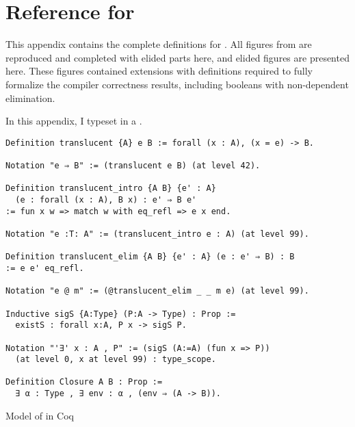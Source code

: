 \renewcommand{\techprefix}{refpcc}
\renewcommand{\tlang}{\pcctlang}
\renewcommand{\slang}{\pccslang}

\chapter{Reference for \pcctlang}
\label{sec:param-cc:appendix}
This appendix contains the complete definitions for \pcctlang.
All \pcctlang figures from  are reproduced and completed
with elided parts here, and elided figures are presented here.
These figures contained extensions with definitions required to fully formalize
the compiler correctness results, including booleans with non-dependent
elimination.

\begin{typographical}
  In this appendix, I typeset \pcctlang in a \emph{}.
\end{typographical}

\FigCoCCCSyntaxFull[ht]
\FigCoCCCSugar[ht]
\FigCoCCCRedFull[ht]
\FigCoCCCConv[ht]
\FigCoCCCEquivFull[ht]
\FigCoCCCTypingOne[ht]
\FigCoCCCTypingTwo[ht]

\begingroup
\let\label\discard
\renewcommand{\cpstlang}{\pcctlang}
\renewcommand{\slang}{\pcctlang}
\renewcommand{\sfont}{\pccfont}
\renewcommand{\sfontsym}{\pccfontsym}
\renewcommand{\scolor}{\pcccolor}

\FigCPSWf[ht]
\FigECCObs[ht]
\FigECCProg[ht]
\FigECCEval[ht]

\endgroup

\begingroup
\let\label\discard
\renewcommand{\cpsslang}{\pcctlang}
\renewcommand{\sfont}{\pccfont}
\renewcommand{\sfontsym}{\pccfontsym}
\renewcommand{\scolor}{\pcccolor}

\FigCOCLinking
\endgroup

\FloatBarrier

\begin{listing}[h]
\begin{verbatim}
Definition translucent {A} e B := forall (x : A), (x = e) -> B.

Notation "e ⇒ B" := (translucent e B) (at level 42).

Definition translucent_intro {A B} {e' : A}
  (e : forall (x : A), B x) : e' ⇒ B e'
:= fun x w => match w with eq_refl => e x end.

Notation "e :T: A" := (translucent_intro e : A) (at level 99).

Definition translucent_elim {A B} {e' : A} (e : e' ⇒ B) : B
:= e e' eq_refl.

Notation "e @ m" := (@translucent_elim _ _ m e) (at level 99).

Inductive sigS {A:Type} (P:A -> Type) : Prop :=
  existS : forall x:A, P x -> sigS P.

Notation "'∃' x : A , P" := (sigS (A:=A) (fun x => P))
  (at level 0, x at level 99) : type_scope.

Definition Closure A B : Prop :=
  ∃ α : Type , ∃ env : α , (env ⇒ (A -> B)).
\end{verbatim}
\caption{Model of \pcctlang in Coq}
\end{listing}

